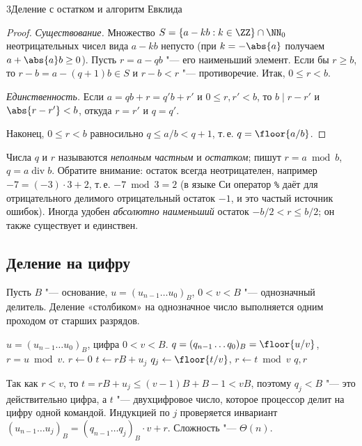 \begin{lecture}{3}{Деление с остатком и алгоритм Евклида}
\begin{proof}
\emph{Существование.} Множество $S = \{a - kb : k \in \ZZ\} \cap \NN_0$ неотрицательных чисел вида
$a - kb$ непусто (при $k = -\abs{a}$ получаем $a + \abs{a} b \ge 0$). Пусть $r = a - qb$ "---
его наименьший элемент. Если бы $r \ge b$, то $r - b = a - (q + 1)b \in S$ и $r - b < r$ "---
противоречие. Итак, $0 \le r < b$.

\emph{Единственность.} Если $a = qb + r = q'b + r'$ и $0 \le r, r' < b$, то $b \mid r - r'$
и $\abs{r - r'} < b$, откуда $r = r'$ и $q = q'$.

Наконец, $0 \le r < b$ равносильно $q \le a/b < q + 1$, т.\,е. $q = \floor{a/b}$.
\end{proof}

Числа $q$ и $r$ называются \emph{неполным частным} и \emph{остатком}; пишут $r = a \bmod b$,
$q = a \operatorname{div} b$. Обратите внимание: остаток всегда неотрицателен, например
$-7 = (-3) \cdot 3 + 2$, т.\,е. $-7 \bmod 3 = 2$ (в языке Си оператор \texttt{\%} даёт для
отрицательного делимого отрицательный остаток $-1$, и это частый источник ошибок). Иногда
удобен \emph{абсолютно наименьший} остаток $-b/2 < r \le b/2$; он также существует и единствен.

\subsection{Деление на цифру}

Пусть $B$ "--- основание, $u = (u_{n-1} \dots u_0)_B$, $0 < v < B$ "--- однозначный делитель.
Деление «столбиком» на однозначное число выполняется одним проходом от старших разрядов.

\begin{algorithm}
\begin{algorithmic}[1]
\Require $u = (u_{n-1} \dots u_0)_B$, цифра $0 < v < B$.
\Ensure $q = (q_{n-1} \dots q_0)_B = \floor{u/v}$, $r = u \bmod v$.
\State $r \gets 0$
  \State $t \gets rB + u_j$ 
  \State $q_j \gets \floor{t / v}$, \quad $r \gets t \bmod v$
\EndFor
\State \Return $q, r$
\end{algorithmic}
\end{algorithm}

Так как $r < v$, то $t = rB + u_j \le (v - 1)B + B - 1 < vB$, поэтому $q_j < B$ "--- это
действительно цифра, а $t$ "--- двухцифровое число, которое процессор делит на цифру одной
командой. Индукцией по $j$ проверяется инвариант
$(u_{n-1} \dots u_j)_B = (q_{n-1} \dots q_j)_B \cdot v + r$. Сложность "--- $\Theta(n)$.


\end{lecture}
